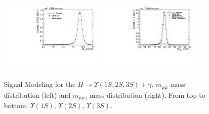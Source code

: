 \begin{figure}[!htbp]
\begin{center}
\includegraphics[width=0.45\textwidth]{figures/fitPlotFiles2D/HToUpsilonPhotonSignalAndBackgroundFit/mMuMNU_HToUpsilon3SPhotonSignalAndBackgroundFit_Signal_Cat0}\hspace*{1.cm}
\includegraphics[width=0.45\textwidth]{figures/fitPlotFiles2D/HToUpsilonPhotonSignalAndBackgroundFit/mHZ_HToUpsilon3SPhotonSignalAndBackgroundFit_Signal_Cat0_default}\hspace*{1.cm}


\end{center}\vspace*{-.5cm}
\caption{Signal Modeling for the $H \rightarrow \Upsilon(1S,2S,3S) +\gamma$. $m_{\mu\mu}$ mass distribution (left) and $m_{\mu\mu\gamma}$ mass distribution (right). From top to bottom: $\Upsilon(1S)$, $\Upsilon(2S)$, $\Upsilon(3S)$.}
\label{fig:HToUpsilon_Signal_Cat0}
\end{figure}

\clearpage
